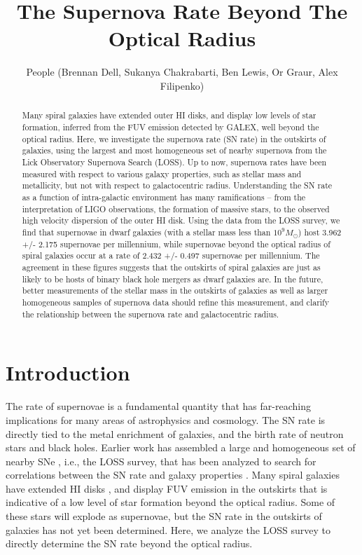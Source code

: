 \documentclass[apj]{emulateapj}
\begin{document}
\title{The Supernova Rate Beyond The Optical Radius}

\author{People (Brennan Dell, Sukanya Chakrabarti, Ben Lewis, Or Graur, Alex Filipenko)}

\begin{abstract}
Many spiral galaxies have extended outer HI disks, and display low levels of star formation, inferred from the FUV emission detected by GALEX, well beyond the optical radius. Here, we investigate the supernova rate (SN rate) in the outskirts of galaxies, using the largest and most homogeneous set of nearby supernova from the Lick Observatory Supernova Search (LOSS).    Up to now, supernova rates have been measured with respect to various galaxy properties, such as stellar mass and metallicity, but not with respect to galactocentric radius.  Understanding the SN rate as a function of intra-galactic environment has many ramifications -- from the interpretation of LIGO observations, the formation of massive stars, to the observed high velocity dispersion of the outer HI disk.  Using the data from the LOSS survey, we find that supernovae in dwarf galaxies (with a stellar mass less than $10^{9} M_{\odot}$) host 3.962 +/- 2.175 supernovae per millennium, while supernovae beyond the optical radius of spiral galaxies occur at a rate of 2.432 +/- 0.497 supernovae per millennium. The agreement in these figures suggests that the outskirts of spiral galaxies are just as likely to be hosts of binary black hole mergers as dwarf galaxies are. In the future, better measurements of the stellar mass in the outskirts of galaxies as well as larger homogeneous samples of supernova data should refine this measurement, and clarify the relationship between the supernova rate and galactocentric radius.
\end{abstract}

\section{Introduction}

The rate of supernovae is a fundamental quantity that has far-reaching implications for many areas of astrophysics and cosmology.  The SN rate is directly tied to the metal enrichment of galaxies, and the birth rate of neutron stars and black holes.  Earlier work has assembled a large and homogeneous set of nearby SNe \citep{Leaman11}, i.e., the LOSS survey, that has been analyzed to search for correlations between the SN rate and galaxy properties \citep{Graur17}.  Many spiral galaxies have extended HI disks \citep{Walter08}, and display FUV emission in the outskirts \citep{Thilker07} \citep{Bigiel10}  that is indicative of a low level of star formation beyond the optical radius. Some of these stars will explode as supernovae, but the SN rate in the outskirts of galaxies has not yet been determined.  Here, we analyze the LOSS survey to directly determine the SN rate beyond the optical radius.
\end{document}
